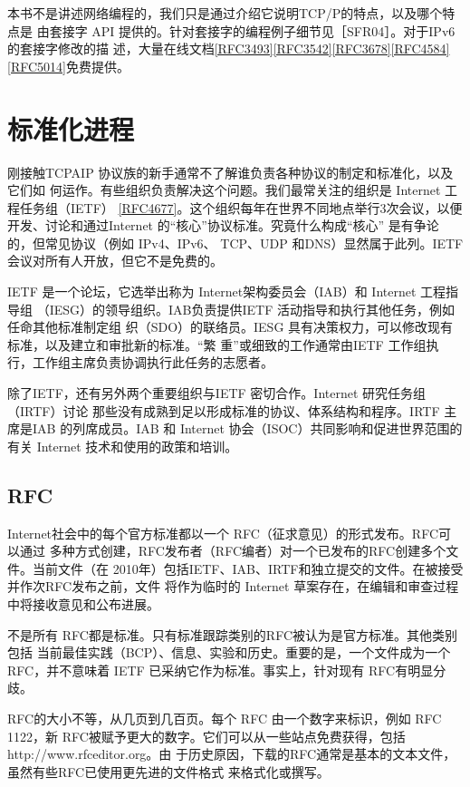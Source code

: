 本书不是讲述网络编程的，我们只是通过介绍它说明TCP/P的特点，以及哪个特点是
由套接字 API 提供的。针对套接字的编程例子细节见［SFR04］。对于IPv6 的套接字修改的描
述，大量在线文档\href{https://www.rfc-editor.org/rfc/rfc3493}{[RFC3493]}\href{https://www.rfc-editor.org/rfc/rfc3542}{[RFC3542]}\href{https://www.rfc-editor.org/rfc/rfc3678}{[RFC3678]}\href{https://www.rfc-editor.org/rfc/rfc4584}{[RFC4584]}\href{https://www.rfc-editor.org/rfc/rfc5014}{[RFC5014]}免费提供。

\section{标准化进程}
刚接触TCPAIP 协议族的新手通常不了解谁负责各种协议的制定和标准化，以及它们如
何运作。有些组织负责解决这个问题。我们最常关注的组织是 Internet 工程任务组（IETF）
\href{https://www.rfc-editor.org/rfc/rfc4677}{[RFC4677]}。这个组织每年在世界不同地点举行3次会议，以便开发、讨论和通过Internet
的“核心”协议标准。究竟什么构成“核心” 是有争论的，但常见协议（例如 IPv4、IPv6、
TCP、UDP 和DNS）显然属于此列。IETF 会议对所有人开放，但它不是免费的。

IETF 是一个论坛，它选举出称为 Internet架构委员会（IAB）和 Internet 工程指导组
（IESG）的领导组织。IAB负责提供IETF 活动指导和执行其他任务，例如任命其他标准制定组
织（SDO）的联络员。IESG 具有决策权力，可以修改现有标准，以及建立和审批新的标准。“繁
重”或细致的工作通常由IETF 工作组执行，工作组主席负责协调执行此任务的志愿者。

除了IETF，还有另外两个重要组织与IETF 密切合作。Internet 研究任务组（IRTF）讨论
那些没有成熟到足以形成标准的协议、体系结构和程序。IRTF 主席是IAB 的列席成员。IAB
和 Internet 协会（ISOC）共同影响和促进世界范围的有关 Internet 技术和使用的政策和培训。

\subsection{RFC}
Internet社会中的每个官方标准都以一个 RFC（征求意见）的形式发布。RFC可以通过
多种方式创建，RFC发布者（RFC编者）对一个已发布的RFC创建多个文件。当前文件（在
2010年）包括IETF、IAB、IRTF和独立提交的文件。在被接受并作次RFC发布之前，文件
将作为临时的 Internet 草案存在，在编辑和审查过程中将接收意见和公布进展。

不是所有 RFC都是标准。只有标准跟踪类别的RFC被认为是官方标准。其他类别包括
当前最佳实践（BCP）、信息、实验和历史。重要的是，一个文件成为一个 RFC，并不意味着
IETF 已采纳它作为标准。事实上，针对现有 RFC有明显分歧。

RFC的大小不等，从几页到几百页。每个 RFC 由一个数字来标识，例如 RFC 1122，新
RFC被赋予更大的数字。它们可以从一些站点免费获得，包括 http://www.rfceditor.org。由
于历史原因，下载的RFC通常是基本的文本文件，虽然有些RFC已使用更先进的文件格式
来格式化或撰写。

